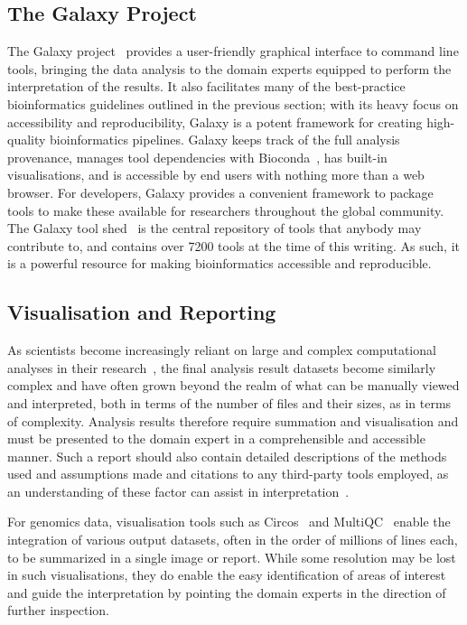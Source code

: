 \begin{justify}
\subsection{The Galaxy Project}
The Galaxy project~\cite{afgan2016galaxy} provides a user-friendly graphical interface to command line tools, bringing the data analysis to the domain experts equipped to perform the interpretation of the results. It also facilitates many of the best-practice bioinformatics guidelines outlined in the previous section; with its heavy focus on accessibility and reproducibility, Galaxy is a potent framework for creating high-quality bioinformatics pipelines. Galaxy keeps track of the full analysis provenance, manages tool dependencies with Bioconda~\cite{gruning2017bioconda}, has built-in visualisations, and is accessible by end users with nothing more than a web browser. For developers, Galaxy provides a convenient framework to package tools to make these available for researchers throughout the global community. The Galaxy tool shed~\cite{url-toolshed} is the central repository of tools that anybody may contribute to, and contains over 7200 tools at the time of this writing. As such, it is a powerful resource for making bioinformatics accessible and reproducible.

\subsection{Visualisation and Reporting}
As scientists become increasingly reliant on large and complex computational analyses in their research~\cite{chen2014big}, the final analysis result datasets become similarly complex and have often grown beyond the realm of what can be manually viewed and interpreted, both in terms of the number of files and their sizes, as in terms of complexity. Analysis results therefore require summation and visualisation and must be presented to the domain expert in a comprehensible and accessible manner. Such a report should also contain detailed descriptions of the methods used and assumptions made and citations to any third-party tools employed, as an understanding of these factor can assist in interpretation~\cite{kumar2007bioinformatics}.

For genomics data, visualisation tools such as Circos~\cite{circos} and MultiQC~\cite{ewels2016multiqc} enable the integration of various output datasets, often in the order of millions of lines each, to be summarized in a single image or report. While some resolution may be lost in such visualisations, they do enable the easy identification of areas of interest and guide the interpretation by pointing the domain experts in the direction of further inspection.



\end{justify}
